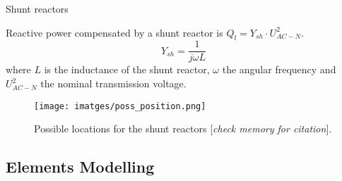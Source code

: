 \begin{frame}{Shunt reactors}

Reactive power compensated by a shunt reactor is $Q_l = {Y}_{sh}\cdot U_{AC-N}^2$.
\begin{equation}
    {Y}_{sh} = \frac{1}{j\omega L}
\end{equation}
where $L$ is the inductance of the shunt reactor, $\omega$ the angular frequency and $U_{AC-N}^2$ the nominal transmission voltage.
\begin{figure}
  \centering
  
  \begin{minipage}{0.45\textwidth}
    \centering
    \caption{Shunt reactor model.}
    \label{fig:shunt_reactor_model}
  \end{minipage}
  \begin{minipage}{0.45\textwidth}
    \centering
    \texttt{[image: imatges/poss\_position.png]}
    \caption{Possible locations for the shunt reactors [\textit{check memory for citation}].}
    \label{fig:compensation_effect}
  \end{minipage}\hfill
\end{figure}

\end{frame}
\subsection{Elements Modelling}

